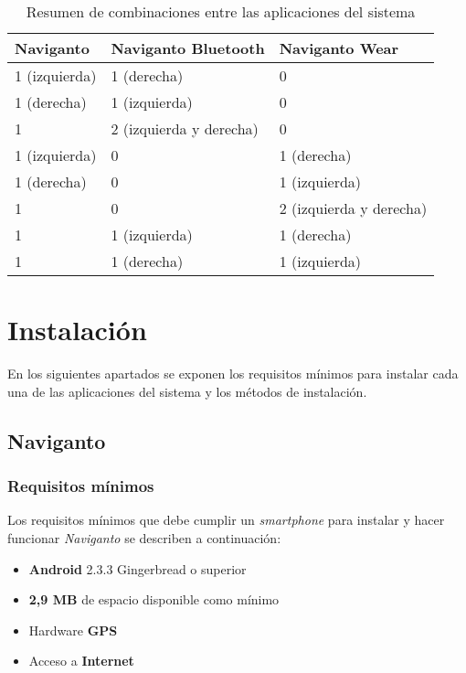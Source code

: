 \begin{table}[h]
  \centering
  \begin{tabular}{|l|l|l|}
    \hline
    \textbf{Naviganto} & \textbf{Naviganto Bluetooth} & \textbf{Naviganto Wear} \\
    \hline
    1 (izquierda) & 1 (derecha)             & 0                       \\
    \hline
    1 (derecha)   & 1 (izquierda)           & 0                       \\
    \hline
    1             & 2 (izquierda y derecha) & 0                       \\
    \hline
    1 (izquierda) & 0                       & 1 (derecha)             \\
    \hline
    1 (derecha)   & 0                       & 1 (izquierda)           \\
    \hline
    1             & 0                       & 2 (izquierda y derecha) \\
    \hline
    1             & 1 (izquierda)           & 1 (derecha)             \\
    \hline
    1             & 1 (derecha)             & 1 (izquierda)           \\
    \hline
  \end{tabular}
  \caption{Resumen de combinaciones entre las aplicaciones del sistema}
  \label{cuadro:convinacionesApps}
\end{table}

\section{Instalación}

En los siguientes apartados se exponen los requisitos mínimos para instalar cada una de las
aplicaciones del sistema y los métodos de instalación.

\subsection{Naviganto}

\subsubsection{Requisitos mínimos}

Los requisitos mínimos que debe cumplir un \emph{smartphone} para instalar y hacer funcionar
\emph{Naviganto} se describen a continuación:

\begin{itemize}
  \item \textbf{Android} 2.3.3 Gingerbread o superior
  \item \textbf{2,9 MB} de espacio disponible como mínimo
  \item Hardware \textbf{GPS}
  \item Acceso a \textbf{Internet}
\end{itemize}

